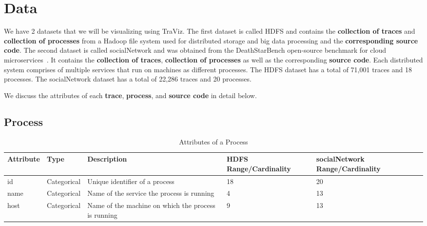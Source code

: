 \section{Data}

We have 2 datasets that we will be visualizing using TraViz.
The first dataset is called HDFS and contains the \textbf{collection of traces} and \textbf{collection of processes}
from a Hadoop file system used for distributed storage 
and big data processing and the \textbf{corresponding source code}.
The second dataset is called socialNetwork and was obtained from the DeathStarBench open-source benchmark for cloud microservices~\cite{gan2019open}.
It contains the \textbf{collection of traces}, \textbf{collection of processes} as well as the corresponding \textbf{source code}.
Each distributed system comprises of multiple services that run on machines as different processes.
The HDFS dataset has a total of 71,001 traces and 18 processes.
The socialNetwork dataset has a total of 22,286 traces and 20 processes.

We discuss the attributes of each \textbf{trace}, \textbf{process}, and \textbf{source code} in detail below.

\subsection{Process}

\begin{table*}[]
  \centering
  \begin{adjustbox}{width=1\textwidth}
  \begin{tabular}{|l|l|l|l|l|}
  \hline
  Attribute & Type        & Description                                & HDFS Range/Cardinality & socialNetwork Range/Cardinality \\ \hline
  id        & Categorical & Unique identifier of a process             & 18                     & 20                              \\ \hline
  name      & Categorical & Name of the service the process is running & 4                      & 13                              \\ \hline
  host      & Categorical & Name of the machine on which the process is running & 9 & 13 \\ \hline
  \end{tabular}
\end{adjustbox}

\label{tab:process}
\caption{Attributes of a Process}
\end{table*}

